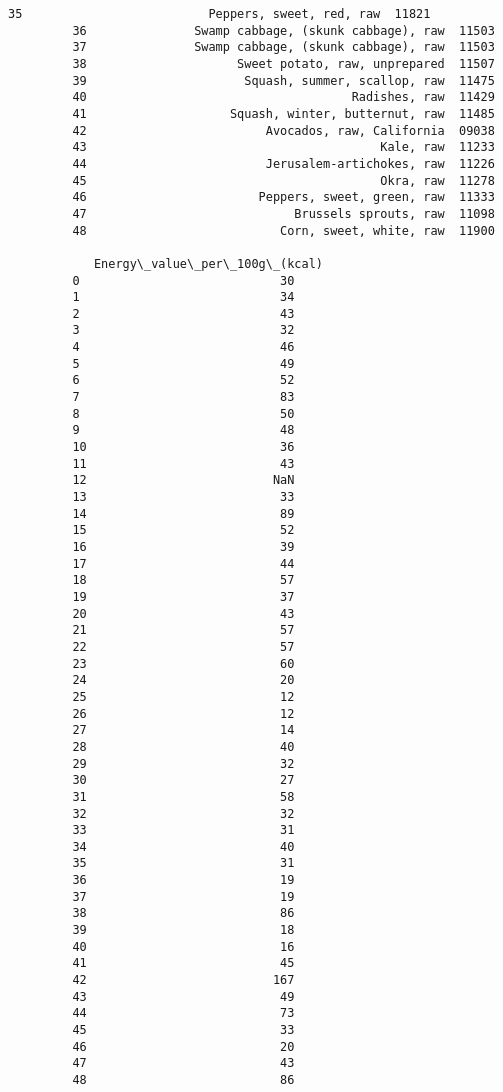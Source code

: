 \documentclass[11pt]{article}
\begin{document}
\begin{Verbatim}[commandchars=\\\{\}]
         35                          Peppers, sweet, red, raw  11821   
         36               Swamp cabbage, (skunk cabbage), raw  11503   
         37               Swamp cabbage, (skunk cabbage), raw  11503   
         38                     Sweet potato, raw, unprepared  11507   
         39                      Squash, summer, scallop, raw  11475   
         40                                     Radishes, raw  11429   
         41                    Squash, winter, butternut, raw  11485   
         42                         Avocados, raw, California  09038   
         43                                         Kale, raw  11233   
         44                         Jerusalem-artichokes, raw  11226   
         45                                         Okra, raw  11278   
         46                        Peppers, sweet, green, raw  11333   
         47                             Brussels sprouts, raw  11098   
         48                           Corn, sweet, white, raw  11900   
         
            Energy\_value\_per\_100g\_(kcal)  
         0                            30  
         1                            34  
         2                            43  
         3                            32  
         4                            46  
         5                            49  
         6                            52  
         7                            83  
         8                            50  
         9                            48  
         10                           36  
         11                           43  
         12                          NaN  
         13                           33  
         14                           89  
         15                           52  
         16                           39  
         17                           44  
         18                           57  
         19                           37  
         20                           43  
         21                           57  
         22                           57  
         23                           60  
         24                           20  
         25                           12  
         26                           12  
         27                           14  
         28                           40  
         29                           32  
         30                           27  
         31                           58  
         32                           32  
         33                           31  
         34                           40  
         35                           31  
         36                           19  
         37                           19  
         38                           86  
         39                           18  
         40                           16  
         41                           45  
         42                          167  
         43                           49  
         44                           73  
         45                           33  
         46                           20  
         47                           43  
         48                           86  
\end{Verbatim}
            
\end{document}

